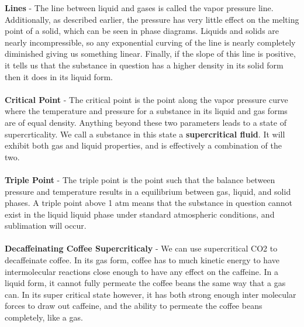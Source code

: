 \documentclass{article}
\begin{document}
	\noindent\textbf{Lines} - The line between liquid and gases is called the vapor pressure line. Additionally, as described earlier, the pressure has very little effect on the melting point of a solid, which can be seen in phase diagrams. Liquids and solids are nearly incompressible, so any exponential curving of the line is nearly completely diminished giving us something linear. Finally, if the slope of this line is positive, it tells us that the substance in question has a higher density in its solid form then it does in its liquid form.\\
	\\
	\textbf{Critical Point} - The critical point is the point along the vapor pressure curve where the temperature and pressure for a substance in its liquid and gas forms are of equal density. Anything beyond these two parameters leads to a state of supercrticality. We call a substance in this state a \textbf{supercritical fluid}. It will exhibit both gas and liquid properties, and is effectively a combination of the two.\\
	\\
	\textbf{Triple Point} - The triple point is the point such that the balance between pressure and temperature results in a equilibrium between gas, liquid, and solid phases. A triple point above 1 atm means that the substance in question cannot exist  in the liquid liquid phase under standard atmospheric conditions, and sublimation will occur. \\
	\\
	\textbf{Decaffeinating Coffee Supercriticaly} - We can use supercritical CO2 to decaffeinate coffee. In its gas form, coffee has to much kinetic energy to have intermolecular reactions close enough to have any effect on the caffeine. In a liquid form, it cannot fully permeate the coffee beans the same way that a gas can. In its super critical state however, it has both strong enough inter molecular forces to draw out caffeine, and the ability to permeate the coffee beans completely, like a gas.
	
\end{document}
